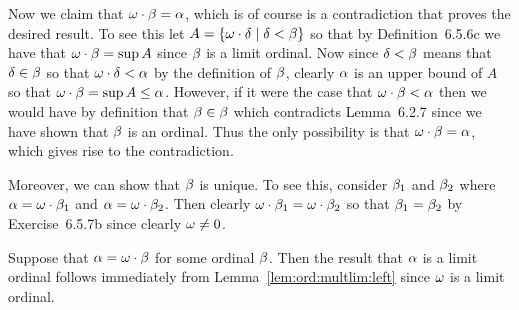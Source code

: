 {{{      Now we claim that $\omega \cdot \beta = \alpha$, which is of course is a contradiction that proves the desired result.
      To see this let $A = \left\{ \omega \cdot \delta \mid \delta < \beta \right\}$ so that by Definition~6.5.6c we have that $\omega \cdot \beta = \sup{A}$ since $\beta$ is a limit ordinal.
      Now since $\delta < \beta$ means that $\delta \in \beta$ so that $\omega \cdot \delta < \alpha$ by the definition of $\beta$, clearly $\alpha$ is an upper bound of $A$ so that $\omega \cdot \beta = \sup{A} \leq \alpha$.
      However, if it were the case that $\omega \cdot \beta < \alpha$ then we would have by definition that $\beta \in \beta$ which contradicts Lemma~6.2.7 since we have shown that $\beta$ is an ordinal.
      Thus the only possibility is that $\omega \cdot \beta = \alpha$, which gives rise to the contradiction.

      Moreover, we can show that $\beta$ is unique.
      To see this, consider $\beta_1$ and $\beta_2$ where $\alpha = \omega \cdot \beta_1$ and $\alpha = \omega \cdot \beta_2$.
      Then clearly $\omega \cdot \beta_1 = \omega \cdot \beta_2$ so that $\beta_1 = \beta_2$ by Exercise~6.5.7b since clearly $\omega \neq 0$.
    }{
      Suppose that $\alpha = \omega \cdot \beta$ for some ordinal $\beta$.
      Then the result that $\alpha$ is a limit ordinal follows immediately from Lemma~\ref{lem:ord:multlim:left} since $\omega$ is a limit ordinal.
    }
  }
}

